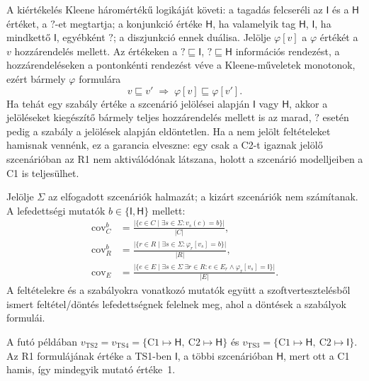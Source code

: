 A kiértékelés Kleene háromértékű logikáját követi: a tagadás felcseréli az $\mathsf{I}$ és a $\mathsf{H}$ értéket, a $\mathsf{?}$-et megtartja; a konjunkció értéke $\mathsf{H}$, ha valamelyik tag $\mathsf{H}$, $\mathsf{I}$, ha mindkettő $\mathsf{I}$, egyébként $\mathsf{?}$; a diszjunkció ennek duálisa. Jelölje $\varphi[v]$ a $\varphi$ értékét a $v$ hozzárendelés mellett. Az értékeken a $\mathsf{?} \sqsubseteq \mathsf{I}$, $\mathsf{?} \sqsubseteq \mathsf{H}$ információs rendezést, a hozzárendeléseken a pontonkénti rendezést véve a Kleene-műveletek monotonok, ezért bármely $\varphi$ formulára
\begin{equation}
v \sqsubseteq v' \;\Longrightarrow\; \varphi[v] \sqsubseteq \varphi[v']. \label{eq:impl-monotone}
\end{equation}
Ha tehát egy szabály értéke a szcenárió jelölései alapján $\mathsf{I}$ vagy $\mathsf{H}$, akkor a jelöléseket kiegészítő bármely teljes hozzárendelés mellett is az marad, $\mathsf{?}$ esetén pedig a szabály a jelölések alapján eldöntetlen. Ha a nem jelölt feltételeket hamisnak vennénk, ez a garancia elveszne: egy csak a C2-t igaznak jelölő szcenárióban az R1 nem aktiválódónak látszana, holott a szcenárió modelljeiben a C1 is teljesülhet.

Jelölje $\Sigma$ az elfogadott szcenáriók halmazát; a kizárt szcenáriók nem számítanak. A lefedettségi mutatók $b \in \{\mathsf{I}, \mathsf{H}\}$ mellett:
\begin{align}
\mathrm{cov}^{b}_{C} &= \frac{\bigl|\{c \in C \mid \exists s \in \Sigma\colon v_s(c) = b\}\bigr|}{|C|}, \label{eq:impl-cov-c}\\
\mathrm{cov}^{b}_{R} &= \frac{\bigl|\{r \in R \mid \exists s \in \Sigma\colon \varphi_r[v_s] = b\}\bigr|}{|R|}, \label{eq:impl-cov-r}\\
\mathrm{cov}_{E} &= \frac{\bigl|\{e \in E \mid \exists s \in \Sigma\ \exists r \in R\colon e \in E_r \land \varphi_r[v_s] = \mathsf{I}\}\bigr|}{|E|}. \label{eq:impl-cov-e}
\end{align}
A feltételekre és a szabályokra vonatkozó mutatók együtt a szoftvertesztelésből ismert feltétel/döntés lefedettségnek felelnek meg, ahol a döntések a szabályok formulái.

A futó példában $v_{\mathrm{TS2}} = v_{\mathrm{TS4}} = \{\mathrm{C1} \mapsto \mathsf{H},\ \mathrm{C2} \mapsto \mathsf{H}\}$ és $v_{\mathrm{TS3}} = \{\mathrm{C1} \mapsto \mathsf{H},\ \mathrm{C2} \mapsto \mathsf{I}\}$. Az R1 formulájának értéke a TS1-ben $\mathsf{I}$, a többi szcenárióban $\mathsf{H}$, mert ott a C1 hamis, így mindegyik mutató értéke~1.
